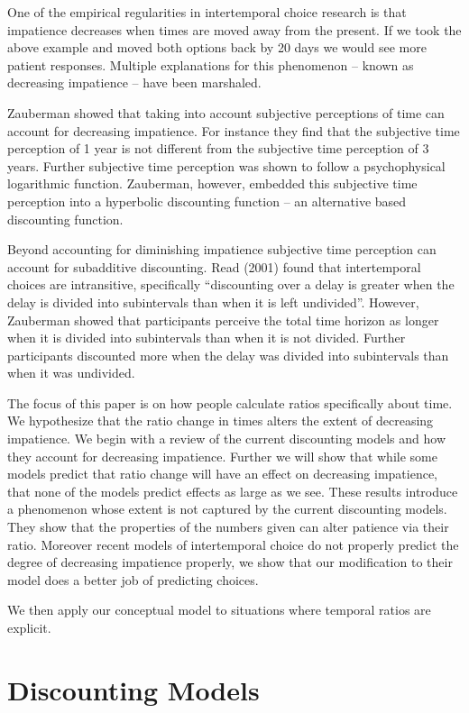 \documentclass[]{article}
\begin{document}
One of the empirical regularities in intertemporal choice research is that impatience decreases when times are moved away from the present.
If we took the above example and moved both options back by 20 days we would see more patient responses. 
Multiple explanations for this phenomenon -- known as decreasing impatience -- have been marshaled. 

Zauberman showed that taking into account subjective perceptions of time can account for decreasing impatience. 
For instance they find that the subjective time perception of 1 year is not different from the subjective time perception of 3 years. 
Further subjective time perception was shown to follow a psychophysical logarithmic function. Zauberman, however, embedded this subjective time perception into a hyperbolic discounting function – an alternative based discounting function.  

Beyond accounting for diminishing impatience subjective time perception can account for subadditive discounting. 
Read (2001) found that intertemporal choices are intransitive, specifically “discounting over a delay is greater when the delay is divided into subintervals than when it is left undivided”. 
However, Zauberman showed that participants perceive the total time horizon as longer when it is divided into subintervals than when it is not divided. 
Further participants discounted more when the delay was divided into subintervals than when it was undivided. 

The focus of this paper is on how people calculate ratios specifically about time. 
We hypothesize that the ratio change in times alters the extent of decreasing impatience. 
We begin with a review of the current discounting models and how they account for decreasing impatience. 
Further we will show that while some models predict that ratio change will have an effect on decreasing impatience, that none of the models predict effects as large as we see. 
These results introduce a phenomenon whose extent is not captured by the current discounting models. 
They show that the properties of the numbers given can alter patience via their ratio. 
Moreover recent models of intertemporal choice do not properly predict the degree of decreasing impatience properly, we show that our modification to their model does a better job of predicting choices. 

We then apply our conceptual model to situations where temporal ratios are explicit. 


\section{Discounting Models}
\end{document}
